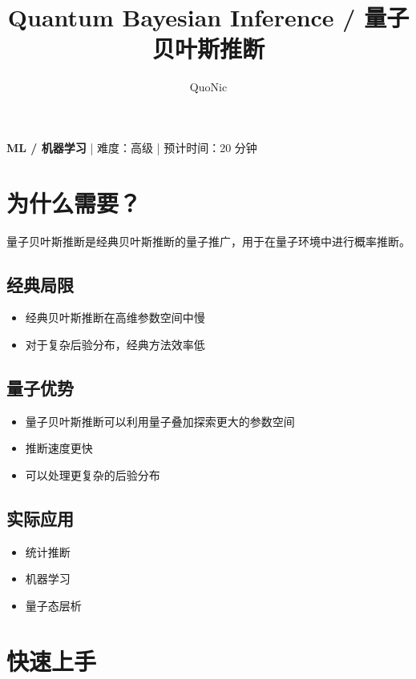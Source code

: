 \documentclass[12pt,a4paper]{article}
\title{Quantum Bayesian Inference / 量子贝叶斯推断}
\author{QuoNic}
\date{}
\begin{document}
\maketitle

\begin{center}
\textbf{ML / 机器学习} | 难度：高级 | 预计时间：20 分钟
\end{center}

\tableofcontents
\newpage

\section{为什么需要？}

量子贝叶斯推断是经典贝叶斯推断的量子推广，用于在量子环境中进行概率推断。

\subsection{经典局限}
\begin{itemize}
  \item 经典贝叶斯推断在高维参数空间中慢
  \item 对于复杂后验分布，经典方法效率低
\end{itemize}

\subsection{量子优势}
\begin{itemize}
  \item 量子贝叶斯推断可以利用量子叠加探索更大的参数空间
  \item 推断速度更快
  \item 可以处理更复杂的后验分布
\end{itemize}

\subsection{实际应用}
\begin{itemize}
  \item 统计推断
  \item 机器学习
  \item 量子态层析
\end{itemize}

\section{快速上手}
\end{document}

